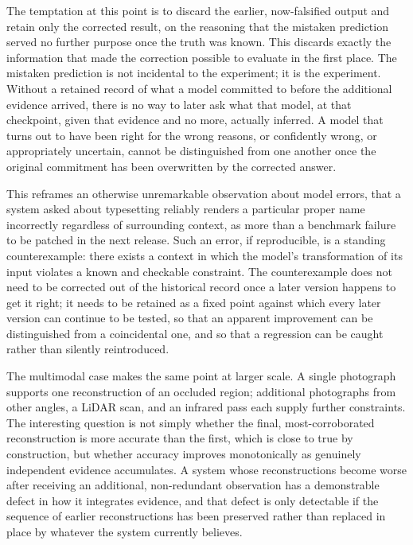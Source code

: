 \documentclass[11pt]{article}
\begin{document}
The temptation at this point is to discard the earlier, now-falsified output and retain only the corrected result, on the reasoning that the mistaken prediction served no further purpose once the truth was known. This discards exactly the information that made the correction possible to evaluate in the first place. The mistaken prediction is not incidental to the experiment; it is the experiment. Without a retained record of what a model committed to before the additional evidence arrived, there is no way to later ask what that model, at that checkpoint, given that evidence and no more, actually inferred. A model that turns out to have been right for the wrong reasons, or confidently wrong, or appropriately uncertain, cannot be distinguished from one another once the original commitment has been overwritten by the corrected answer.

This reframes an otherwise unremarkable observation about model errors, that a system asked about typesetting reliably renders a particular proper name incorrectly regardless of surrounding context, as more than a benchmark failure to be patched in the next release. Such an error, if reproducible, is a standing counterexample: there exists a context in which the model's transformation of its input violates a known and checkable constraint. The counterexample does not need to be corrected out of the historical record once a later version happens to get it right; it needs to be retained as a fixed point against which every later version can continue to be tested, so that an apparent improvement can be distinguished from a coincidental one, and so that a regression can be caught rather than silently reintroduced.

The multimodal case makes the same point at larger scale. A single photograph supports one reconstruction of an occluded region; additional photographs from other angles, a LiDAR scan, and an infrared pass each supply further constraints. The interesting question is not simply whether the final, most-corroborated reconstruction is more accurate than the first, which is close to true by construction, but whether accuracy improves monotonically as genuinely independent evidence accumulates. A system whose reconstructions become worse after receiving an additional, non-redundant observation has a demonstrable defect in how it integrates evidence, and that defect is only detectable if the sequence of earlier reconstructions has been preserved rather than replaced in place by whatever the system currently believes.
\end{document}
